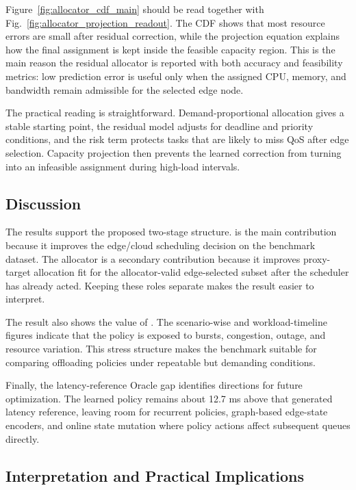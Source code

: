 Figure~\ref{fig:allocator_cdf_main} should be read together with
Fig.~\ref{fig:allocator_projection_readout}. The CDF shows that most resource
errors are small after residual correction, while the projection equation
explains how the final assignment is kept inside the feasible capacity region.
This is the main reason the residual allocator is reported with both accuracy
and feasibility metrics: low prediction error is useful only when the assigned
CPU, memory, and bandwidth remain admissible for the selected edge node.

The practical reading is straightforward. Demand-proportional allocation gives a
stable starting point, the residual model adjusts for deadline and priority
conditions, and the risk term protects tasks that are likely to miss QoS after
edge selection. Capacity projection then prevents the learned correction from
turning into an infeasible assignment during high-load intervals.



\FloatBarrier
\subsection{Discussion}

The results support the proposed two-stage structure. \fedddqn{} is the main contribution because it improves the edge/cloud scheduling decision on the benchmark dataset. The allocator is a secondary contribution because it improves proxy-target allocation fit for the allocator-valid edge-selected subset after the scheduler has already acted. Keeping these roles separate makes the result easier to interpret.

The result also shows the value of \dataset{}. The scenario-wise and workload-timeline figures indicate that the policy is exposed to bursts, congestion, outage, and resource variation. This stress structure makes the benchmark suitable for comparing offloading policies under repeatable but demanding conditions.

Finally, the latency-reference Oracle gap identifies directions for future optimization. The learned policy remains about 12.7 ms above that generated latency reference, leaving room for recurrent policies, graph-based edge-state encoders, and online state mutation where policy actions affect subsequent queues directly.

\subsection{Interpretation and Practical Implications}

